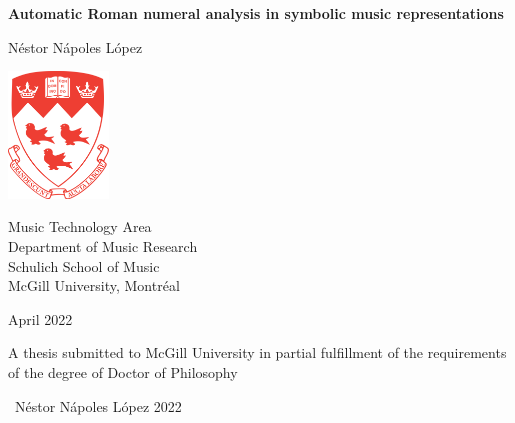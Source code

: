 \begin{titlepage}
\begin{center}

    \huge
    \textbf{Automatic Roman numeral analysis in symbolic music representations}


    \vspace{1cm}

    \LARGE
    N\'estor N\'apoles L\'opez

    \vspace{1cm}

    \includegraphics[width=0.2\textwidth]{./figures/mcgill}

    \vspace{0.5cm}

    \large
    Music Technology Area \\
    Department of Music Research \\
    Schulich School of Music \\
    McGill University, Montr\'eal \\

    \vfill

    April 2022

    \vspace{2cm}

    A thesis submitted to McGill University in partial fulfillment of the requirements of the degree of Doctor of Philosophy

    \vspace{1cm}

    \textcopyright \ N\'estor N\'apoles L\'opez 2022

\end{center}
\end{titlepage}
